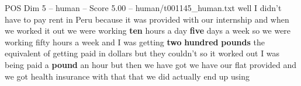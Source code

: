 \begin{textsample}{POS Dim 5 – human – Score 5.00 – human/t001145\_human.txt}  \label{ex:f5_pos_009}
well I didn't have to pay rent in Peru because it was provided with our internship and when we worked it out we were working \textbf{ten} hours a day \textbf{five} days a week so we were working fifty hours a week and I was getting \textbf{two} \textbf{hundred} \textbf{pounds} the equivalent of getting paid in dollars but they couldn't so it worked out I was being paid a \textbf{pound} an hour but then we have got we have our flat provided and we got health insurance with that that we did actually end up using

\end{textsample}
